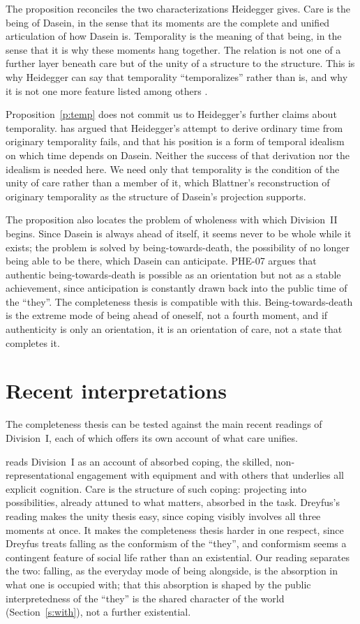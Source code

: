 \documentclass{situationist-preprint}
\begin{document}
The proposition reconciles the two characterizations Heidegger gives. Care is the being of Dasein, in the sense that its moments are the complete and unified articulation of how Dasein is. Temporality is the meaning of that being, in the sense that it is why these moments hang together. The relation is not one of a further layer beneath care but of the unity of a structure to the structure. This is why Heidegger can say that temporality \enquote{temporalizes} rather than is, and why it is not one more feature listed among others \citep[\S65]{Heidegger1927}.

Proposition~\ref{p:temp} does not commit us to Heidegger's further claims about temporality. \citet{Blattner1999} has argued that Heidegger's attempt to derive ordinary time from originary temporality fails, and that his position is a form of temporal idealism on which time depends on Dasein. Neither the success of that derivation nor the idealism is needed here. We need only that temporality is the condition of the unity of care rather than a member of it, which Blattner's reconstruction of originary temporality as the structure of Dasein's projection supports.

The proposition also locates the problem of wholeness with which Division~II begins. Since Dasein is always ahead of itself, it seems never to be whole while it exists; the problem is solved by being-towards-death, the possibility of no longer being able to be there, which Dasein can anticipate. PHE-07 argues that authentic being-towards-death is possible as an orientation but not as a stable achievement, since anticipation is constantly drawn back into the public time of the \enquote{they}. The completeness thesis is compatible with this. Being-towards-death is the extreme mode of being ahead of oneself, not a fourth moment, and if authenticity is only an orientation, it is an orientation of care, not a state that completes it.

\section{Recent interpretations}\label{s:lit}

The completeness thesis can be tested against the main recent readings of Division~I, each of which offers its own account of what care unifies.

\citet{Dreyfus1991} reads Division~I as an account of absorbed coping, the skilled, non-representational engagement with equipment and with others that underlies all explicit cognition. Care is the structure of such coping: projecting into possibilities, already attuned to what matters, absorbed in the task. Dreyfus's reading makes the unity thesis easy, since coping visibly involves all three moments at once. It makes the completeness thesis harder in one respect, since Dreyfus treats falling as the conformism of the \enquote{they}, and conformism seems a contingent feature of social life rather than an existential. Our reading separates the two: falling, as the everyday mode of being alongside, is the absorption in what one is occupied with; that this absorption is shaped by the public interpretedness of the \enquote{they} is the shared character of the world (Section~\ref{s:with}), not a further existential.
\end{document}
